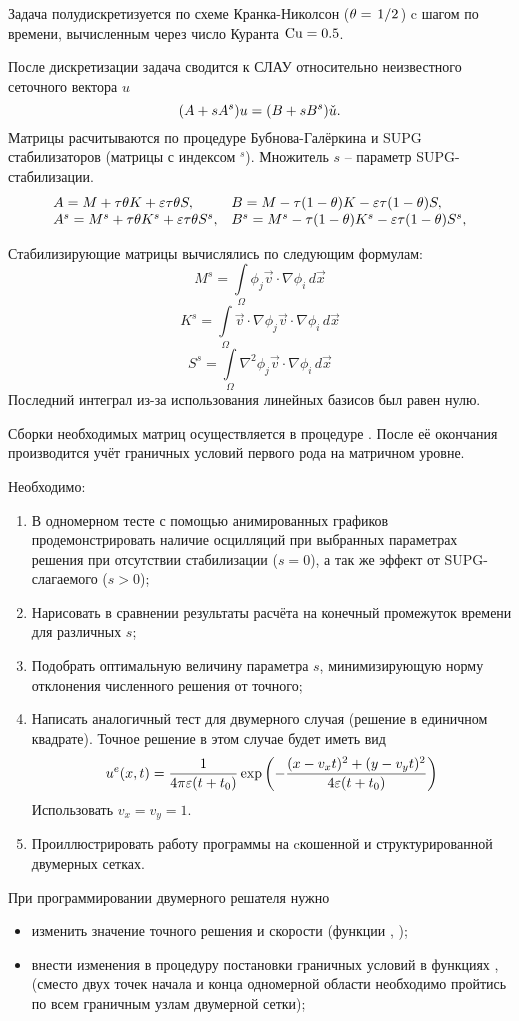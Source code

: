 Задача полудискретизуется по схеме Кранка-Николсон ($\theta=\left.1\middle/2\right.$) c шагом по времени, вычисленным через число Куранта $\rm Cu = 0.5$.

После дискретизации задача сводится к СЛАУ относительно неизвестного сеточного вектора $u$
$$
(A + s A^s) u = (B + s B^s) \check u. \\
$$
Матрицы расчитываются по процедуре Бубнова-Галёркина и SUPG стабилизаторов (матрицы с индексом $^s$).
Множитель $s$ -- параметр SUPG-стабилизации.
$$
\begin{array}{ll}
A = M + \tau\theta K + \varepsilon\tau\theta S, &
B = M - \tau(1-\theta)K - \varepsilon\tau(1-\theta) S, \\
A^s = M^s + \tau\theta K^s + \varepsilon\tau\theta S^s, &
B^s = M^s - \tau(1-\theta)K^s - \varepsilon\tau (1-\theta) S^s, \\
\end{array}
$$

Стабилизирующие матрицы вычислялись по следующим формулам:
$$
M^s = \int\limits_\Omega \phi_j \vec v \cdot \nabla \phi_i \, d\vec x
$$
$$
K^s = \int\limits_\Omega \vec v \cdot \nabla \phi_j \vec v \cdot \nabla \phi_i \, d\vec x
$$
$$
S^s = \int\limits_\Omega \nabla^2 \phi_j \vec v \cdot \nabla \phi_i \, d\vec x
$$
Последний интеграл из-за использования линейных базисов был равен нулю.

Сборки необходимых матриц осуществляется в процедуре .
После её окончания производится учёт граничных условий первого рода на матричном уровне.


Необходимо:
\begin{enumerate}
\item В одномерном тесте  с помощью анимированных графиков продемонстрировать наличие осцилляций
      при выбранных параметрах решения при отсутствии стабилизации ($s = 0$), а так же эффект от SUPG-слагаемого ($s > 0$);
\item Нарисовать в сравнении результаты расчёта на конечный промежуток времени для различных $s$;
\item Подобрать оптимальную величину параметра $s$, минимизирующую норму отклонения численного решения от точного;
\item Написать аналогичный тест для двумерного случая (решение в единичном квадрате). Точное решение в этом случае будет иметь вид
$$
u^e(x, t) = \frac{1}{4\pi \varepsilon (t + t_0)} \exp\left(-\frac{(x - v_x t)^2 + (y - v_y t)^2}{4\varepsilon(t+t_0)}\right)
$$
Использовать $v_x = v_y = 1$.
\item Проиллюстрировать работу программы на cкошенной и структурированной двумерных сетках.
\end{enumerate}

При программировании двумерного решателя нужно 
\begin{itemize}
\item изменить значение точного решения и скорости (функции , );
\item внести изменения в процедуру постановки граничных условий в функциях ,  (сместо двух точек начала и конца одномерной области
необходимо пройтись по всем граничным узлам двумерной сетки);
\end{itemize}

